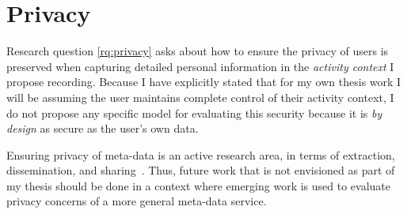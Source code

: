 \section{Privacy}
\label{ch:evaluation:sec:privacy}

Research question \ref{rq:privacy} asks about how to ensure the privacy of users
is preserved when capturing detailed personal information in the \emph{activity
    context} I propose recording.  Because I have explicitly stated that for my own
thesis work I will be assuming the user maintains complete control of their
activity context, I do not propose any specific model for evaluating this
security because it is \emph{by design} as secure as the user's own data.

Ensuring privacy of meta-data is an active research area, in terms of
extraction, dissemination, and
sharing~\cite{10.1007/978-3-030-72465-8_14,eskandarian2021express,budzko2019architecture}.
Thus, future work that is not envisioned as part of my thesis should be done in
a context where emerging work is used to evaluate privacy concerns of a more
general meta-data service.



